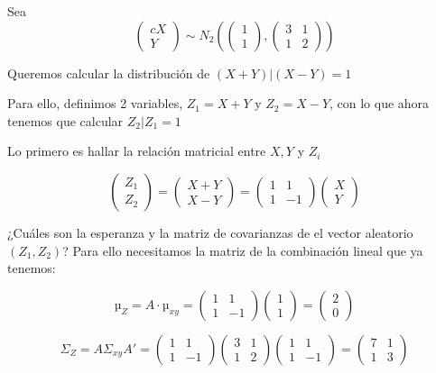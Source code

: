 \begin{example}
Sea \[\begin{pmatrix}{c}X\\Y\end{pmatrix} \sim
N_2\left( \begin{pmatrix}1\\1\end{pmatrix}, \begin{pmatrix} 3&1\\1&2 \end{pmatrix}\right)\]

Queremos calcular la distribución de $(X+Y) | (X-Y) = 1$

Para ello, definimos 2 variables, $Z_1 = X+Y$ y $Z_2 = X-Y$, con lo que ahora tenemos que calcular $Z_2 | Z_1 = 1$

Lo primero es hallar la relación matricial entre $X,Y$ y $Z_i$

\begin{equation*}
	\begin{pmatrix}Z_1 \\ Z_2 \end{pmatrix} = \begin{pmatrix}X+Y\\X-Y\end{pmatrix} = \begin{pmatrix} 1 & 1\\1&-1 \end{pmatrix}\begin{pmatrix}X\\Y\end{pmatrix}
\end{equation*}

¿Cuáles son la esperanza y la matriz de covarianzas de el vector aleatorio $(Z_1,Z_2)$? Para ello necesitamos la matriz de la combinación lineal que ya tenemos:

\[
µ_Z = A·µ_{xy} = \begin{pmatrix}1&1\\1&-1\end{pmatrix} \begin{pmatrix}1\\1\end{pmatrix} = \begin{pmatrix} 2\\0 \end{pmatrix}
\]

\[
Σ_Z = AΣ_{xy}A' = \begin{pmatrix}1&1\\1&-1\end{pmatrix} \begin{pmatrix} 3&1\\1&2 \end{pmatrix}  \begin{pmatrix}1&1\\1&-1\end{pmatrix} = \begin{pmatrix}7&1\\1&3\end{pmatrix}
\]


\end{example}
